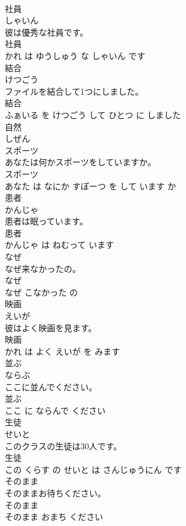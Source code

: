 \documentclass[8pt]{extreport}
\begin{document}
\begin{CJK}{UTF8}{min}
\\	社員	
\\	しゃいん			
\\	彼は優秀な社員です。	
\\	社員 
\\	かれ は ゆうしゅう な しゃいん です			
\\	結合	
\\	けつごう			
\\	ファイルを結合して1つにしました。	
\\	結合 
\\	ふぁいる を けつごう して ひとつ に しました			
\\	自然	
\\	しぜん			
\\	スポーツ	
\\	あなたは何かスポーツをしていますか。	
\\	スポーツ 
\\	あなた は なにか すぽーつ を して います か			
\\	患者	
\\	かんじゃ			
\\	患者は眠っています。	
\\	患者 
\\	かんじゃ は ねむって います			
\\	なぜ	
\\	なぜ来なかったの。	
\\	なぜ 
\\	なぜ こなかった の			
\\	映画	
\\	えいが			
\\	彼はよく映画を見ます。	
\\	映画 
\\	かれ は よく えいが を みます			
\\	並ぶ	
\\	ならぶ			
\\	ここに並んでください。	
\\	並ぶ 
\\	ここ に ならんで ください			
\\	生徒	
\\	せいと			
\\	このクラスの生徒は30人です。	
\\	生徒 
\\	この くらす の せいと は さんじゅうにん です			
\\	そのまま	
\\	そのままお待ちください。	
\\	そのまま 
\\	そのまま おまち ください			

\end{CJK}
\end{document}
